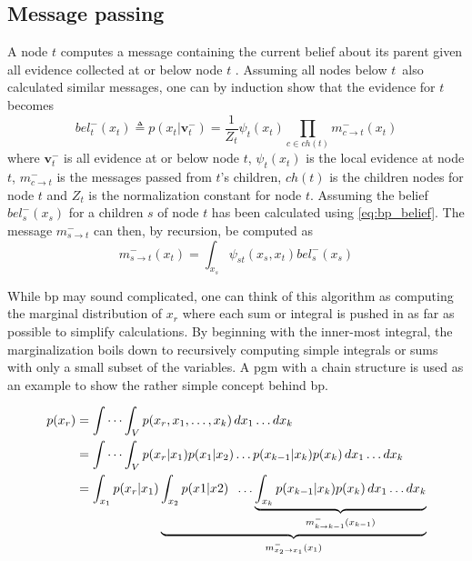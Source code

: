 \subsection{Message passing}
A node $t$ computes a message containing the current belief about its parent given all evidence collected at or below node $t$ \cite{murphy}. Assuming all nodes below $t$ also calculated similar messages, one can by induction show that the evidence for $t$ becomes
\begin{equation}\label{eq:bp_belief}
    bel_t^-(x_t) \triangleq p(x_t | \mathbf{v}_t^-) = \frac{1}{Z_t}\psi_t(x_t) \prod_{c \in ch(t)} m_{c\to t}^-(x_t)
\end{equation}
where $\mathbf{v}_t^-$ is all evidence at or below node $t$, $\psi_t(x_t)$ is the local evidence at node $t$, $m_{c \to t}^-$ is the messages passed from $t$'s children, $ch(t)$ is the children nodes for node $t$ and $Z_t$ is the normalization constant for node $t$.
Assuming the belief $bel_s^-(x_s)$ for a children $s$ of node $t$ has been calculated using \cref{eq:bp_belief}. The message $m_{s\to t}^-$ can then, by recursion, be computed as
\begin{equation}\label{eq:bp_message}
    m_{s \to t}^-(x_t) = \int_{x_s} \psi_{st}(x_s, x_t) bel_s^-(x_s)
\end{equation}

While \acrshort{bp} may sound complicated, one can think of this algorithm as computing the marginal distribution of $x_r$ where each sum or integral is pushed in as far as possible to simplify calculations. By beginning with the inner-most integral, the marginalization boils down to recursively computing simple integrals or sums with only a small subset of the variables. A \acrshort{pgm} with a chain structure is used as an example to show the rather simple concept behind \acrshort{bp}.

\begin{subequations}
\begin{align}
p(x_r) &= \idotsint_V p(x_r, x_1,\dots,x_k) \,dx_1 \dots dx_k\\
&= \idotsint_V p(x_r | x_1)p(x_1|x_2)\dots p(x_{k-1} | x_k)p(x_k) \, dx_1 \dots dx_k\\
&= \int_{x_1} p(x_r | x_1)\underbrace{\int_{x_2}p(x1 | x2) \; \;  \dots \underbrace{\int_{x_k} p(x_{k-1} | x_k)p(x_k) \, dx_1 \dots dx_k}_{m_{k\to k-1}^-(x_{k-1})}}_{m_{x_2 \to x_1}^-(x_1)}
\end{align}
\end{subequations}

